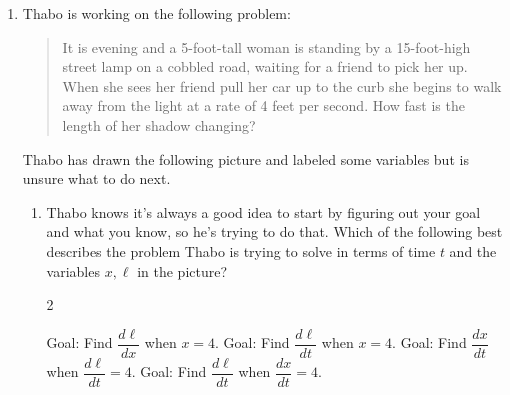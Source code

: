 \documentclass[main]{subfiles}
\begin{document}
\begin{enumerate}
\item  %

  Thabo is working on the following problem:
  \begin{quote}
    It is evening and a 5-foot-tall woman is standing by a 15-foot-high
    street lamp on a cobbled road, waiting for a friend to pick her up.
    When she sees her friend pull her car up to the curb she begins to
    walk away from the light at a rate of 4 feet per second.  How fast
    is the length of her shadow changing?
  \end{quote}
  Thabo has drawn the following picture and labeled some variables but is
  unsure what to do next.

  \begin{center}
  \end{center}



  \begin{enumerate}
  \item
    Thabo knows it's always a good idea to start by figuring out your
    goal and what you know, so he's trying to do that.  Which of the
    following best describes the problem Thabo is trying to solve in
    terms of time $t$ and the variables $x, \ell$ in the picture?
    
      \begin{multicols}{2}
      \begin{enumerate}[label=\protect\maybecircle{\Alph*.}]
      \plainitem Goal: Find $\dfrac{d\ell}{dx}$ when $x = 4$.
      \plainitem Goal: Find $\dfrac{d\ell}{dt}$ when $x = 4$.
      \plainitem Goal: Find $\dfrac{dx}{dt}$ when
        $\dfrac{d\ell}{dt} = 4$.
      \circleitem Goal: Find $\dfrac{d\ell}{dt}$ when
        $\dfrac{dx}{dt} = 4$. 
      \end{enumerate}
      \end{multicols}
    

\end{enumerate}
\end{enumerate}
\end{document}
